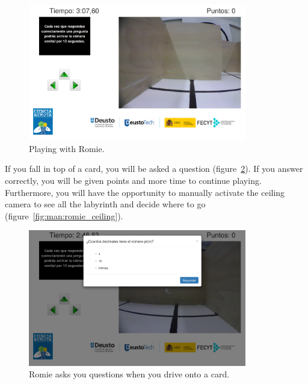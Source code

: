\begin{figure}[!htbp]
	\centering
	\includegraphics[width=0.85\textwidth]{fig/manuals/trivia/romie-start}
	\caption{Playing with Romie.}
	\label{fig:man:romie_start}
\end{figure}

If you fall in top of a card, you will be asked a question (figure~\ref{fig:man:romie_question}). If
you answer correctly, you will be given points and more time to continue playing. Furthermore, you
will have the opportunity to manually activate the ceiling camera to see all the labyrinth and
decide where to go (figure~\ref{fig:man:romie_ceiling}).

\begin{figure}[!htbp]
	\centering
	\includegraphics[width=0.85\textwidth]{fig/manuals/trivia/romie-question}
	\caption{Romie asks you questions when you drive onto a card.}
	\label{fig:man:romie_question}
\end{figure}

